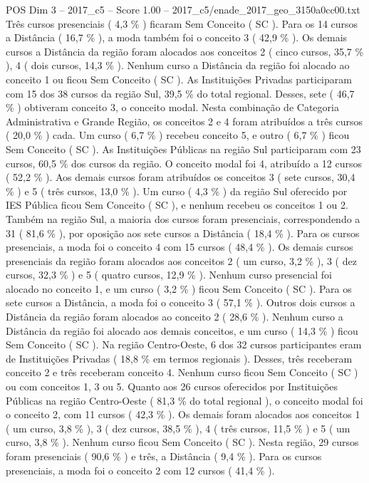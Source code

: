 \begin{textsample}{POS Dim 3 – 2017\_c5 – Score 1.00 – 2017\_c5/enade\_2017\_geo\_3150a0cc00.txt}
Três cursos presenciais ( 4,3 \% ) ficaram Sem Conceito ( SC ).
Para os 14 cursos a Distância ( 16,7 \% ), a moda também foi o conceito 3 ( 42,9 \% ).
Os demais cursos a Distância da região foram alocados aos conceitos 2 ( cinco cursos, 35,7 \% ), 4 ( dois cursos, 14,3 \% ).
Nenhum curso a Distância da região foi alocado ao conceito 1 ou ficou Sem Conceito ( SC ).
As Instituições Privadas participaram com 15 dos 38 cursos da região Sul, 39,5 \% do total regional.
Desses, sete ( 46,7 \% ) obtiveram conceito 3, o conceito modal.
Nesta combinação de Categoria Administrativa e Grande Região, os conceitos 2 e 4 foram atribuídos a três cursos ( 20,0 \% ) cada.
Um curso ( 6,7 \% ) recebeu conceito 5, e outro ( 6,7 \% ) ficou Sem Conceito ( SC ).
As Instituições Públicas na região Sul participaram com 23 cursos, 60,5 \% dos cursos da região.
O conceito modal foi 4, atribuído a 12 cursos ( 52,2 \% ).
Aos demais cursos foram atribuídos os conceitos 3 ( sete cursos, 30,4 \% ) e 5 ( três cursos, 13,0 \% ).
Um curso ( 4,3 \% ) da região Sul oferecido por IES Pública ficou Sem Conceito ( SC ), e nenhum recebeu os conceitos 1 ou 2.
Também na região Sul, a maioria dos cursos foram presenciais, correspondendo a 31 ( 81,6 \% ), por oposição aos sete cursos a Distância ( 18,4 \% ).
Para os cursos presenciais, a moda foi o conceito 4 com 15 cursos ( 48,4 \% ).
Os demais cursos presenciais da região foram alocados aos conceitos 2 ( um curso, 3,2 \% ), 3 ( dez cursos, 32,3 \% ) e 5 ( quatro cursos, 12,9 \% ).
Nenhum curso presencial foi alocado no conceito 1, e um curso ( 3,2 \% ) ficou Sem Conceito ( SC ).
Para os sete cursos a Distância, a moda foi o conceito 3 ( 57,1 \% ).
Outros dois cursos a Distância da região foram alocados ao conceito 2 ( 28,6 \% ).
Nenhum curso a Distância da região foi alocado aos demais conceitos, e um curso ( 14,3 \% ) ficou Sem Conceito ( SC ).
Na região Centro-Oeste, 6 dos 32 cursos participantes eram de Instituições Privadas ( 18,8 \% em termos regionais ).
Desses, três receberam conceito 2 e três receberam conceito 4.
Nenhum curso ficou Sem Conceito ( SC ) ou com conceitos 1, 3 ou 5.
Quanto aos 26 cursos oferecidos por Instituições Públicas na região Centro-Oeste ( 81,3 \% do total regional ), o conceito modal foi o conceito 2, com 11 cursos ( 42,3 \% ).
Os demais foram alocados aos conceitos 1 ( um curso, 3,8 \% ), 3 ( dez cursos, 38,5 \% ), 4 ( três cursos, 11,5 \% ) e 5 ( um curso, 3,8 \% ).
Nenhum curso ficou Sem Conceito ( SC ).
Nesta região, 29 cursos foram presenciais ( 90,6 \% ) e três, a Distância ( 9,4 \% ).
Para os cursos presenciais, a moda foi o conceito 2 com 12 cursos ( 41,4 \% ).

\end{textsample}
